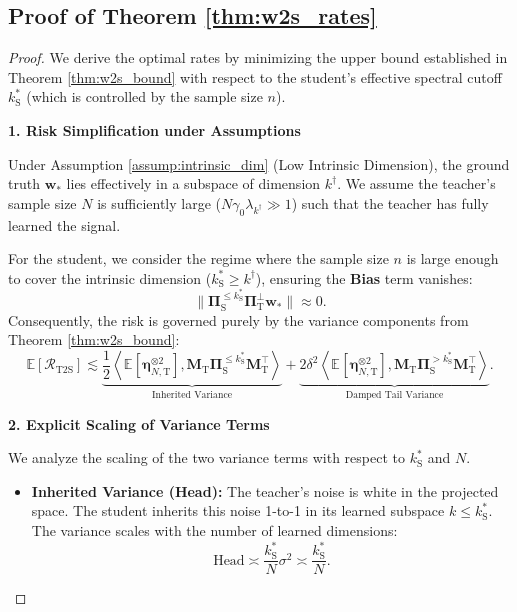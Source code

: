 \documentclass{article}
\theoremstyle{definition}
\theoremstyle{definition}
\theoremstyle{plain}
\theoremstyle{plain}
\theoremstyle{plain}
\theoremstyle{plain}
\theoremstyle{plain}
\newcommand{\bs}[1]{\boldsymbol{\mathbf{#1}}}
\newcommand{\Ex}{\mathbb{E}}
\newcommand{\te}{\mathrm{T}}
\newcommand{\st}{\mathrm{S}}
\newcommand{\M}{\mathbf{M}}
\newcommand{\w}{\mathbf{w}}
\newcommand{\ex}[2][]{\mathbb{E}_{#1}\left[ #2 \right]}
\newcommand{\inner}[1]{\left\langle#1\right\rangle}
\begin{document}
\subsection{Proof of Theorem \ref{thm:w2s_rates}}

\begin{proof}
    We derive the optimal rates by minimizing the upper bound established in Theorem \ref{thm:w2s_bound} with respect to the student's effective spectral cutoff $k^*_\st$ (which is controlled by the sample size $n$).

    \textbf{1. Risk Simplification under Assumptions}
    
    Under Assumption \ref{assump:intrinsic_dim} (Low Intrinsic Dimension), the ground truth $\w_*$ lies effectively in a subspace of dimension $k^\dagger$. We assume the teacher's sample size $N$ is sufficiently large ($N \gamma_0 \lambda_{k^\dagger} \gg 1$) such that the teacher has fully learned the signal.
    
    For the student, we consider the regime where the sample size $n$ is large enough to cover the intrinsic dimension ($k^*_\st \ge k^\dagger$), ensuring the \textbf{Bias} term vanishes:
    \begin{equation}
        \|\bs \Pi_{\st}^{\leq k^*_\st}\bs \Pi_{\te}^{\perp}\w_{*}\| \approx 0.
    \end{equation}
    Consequently, the risk is governed purely by the variance components from Theorem \ref{thm:w2s_bound}:
    \begin{equation}
        \Ex[\mathcal{R}_{\mathrm{T2S}}] \lesssim \underbrace{\frac{1}{2}\inner{\ex{\bs\eta_{N,\te}^{\otimes 2}},\M_\te\bs \Pi_{\st}^{\leq k^*_\st}\M_\te^\top}}_{\text{Inherited Variance}} + \underbrace{2\delta^2\inner{\ex{\bs\eta_{N,\te}^{\otimes 2}},\M_\te\bs \Pi_{\st}^{> k^*_\st}\M_\te^\top}}_{\text{Damped Tail Variance}}.
    \end{equation}

    \textbf{2. Explicit Scaling of Variance Terms}
    
    We analyze the scaling of the two variance terms with respect to $k^*_\st$ and $N$.
    
    \begin{itemize}
        \item \textbf{Inherited Variance (Head):}
        The teacher's noise is white in the projected space. The student inherits this noise 1-to-1 in its learned subspace $k \le k^*_\st$. The variance scales with the number of learned dimensions:
        \begin{equation}
            \text{Head} \asymp \frac{k^*_\st}{N} \sigma^2 \asymp \frac{k^*_\st}{N}.
        \end{equation}
        

\end{itemize}
\end{proof}
\end{document}
